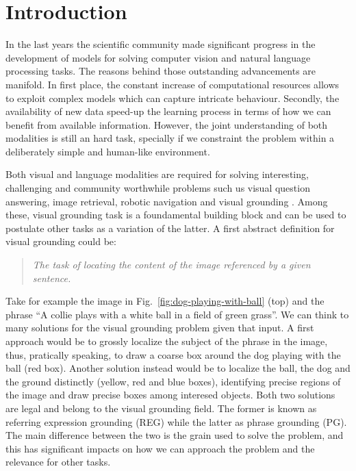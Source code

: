 \chapter{Introduction}
\label{ch:intro}

In the last years the scientific community made significant progress
in the development of models for solving computer vision and natural
language processing tasks. The reasons behind those outstanding
advancements are manifold. In first place, the constant increase of
computational resources allows to exploit complex models which can
capture intricate behaviour. Secondly, the availability of new data
speed-up the learning process in terms of how we can benefit from
available information. However, the joint understanding of both
modalities is still an hard task, specially if we constraint the
problem within a deliberately simple and human-like environment.

Both visual and language modalities are required for solving
interesting, challenging and community worthwhile problems such us
visual question answering, image retrieval, robotic navigation and
visual grounding . Among these, visual grounding
task is a foundamental building block and can be used to postulate
other tasks as a variation of the latter. A first abstract definition
for visual grounding could be:

\begin{quote}
    \textit{The task of locating the content of the image referenced
    by a given sentence.}
\end{quote}

Take for example the image in Fig.~\ref{fig:dog-playing-with-ball}
(top) and the phrase ``A collie plays with a white ball in a field of
green grass''. We can think to many solutions for the visual grounding
problem given that input. A first approach would be to grossly
localize the subject of the phrase in the image, thus, pratically
speaking, to draw a coarse box around the dog playing with the ball
(red box). Another solution instead would be to localize the ball, the
dog and the ground distinctly (yellow, red and blue boxes),
identifying precise regions of the image and draw precise boxes among
interesed objects. Both two solutions are legal and belong to the
visual grounding field. The former is known as referring expression
grounding (REG) while the latter as phrase grounding (PG). The main
difference between the two is the grain used to solve the problem, and
this has significant impacts on how we can approach the problem and
the relevance for other tasks.

